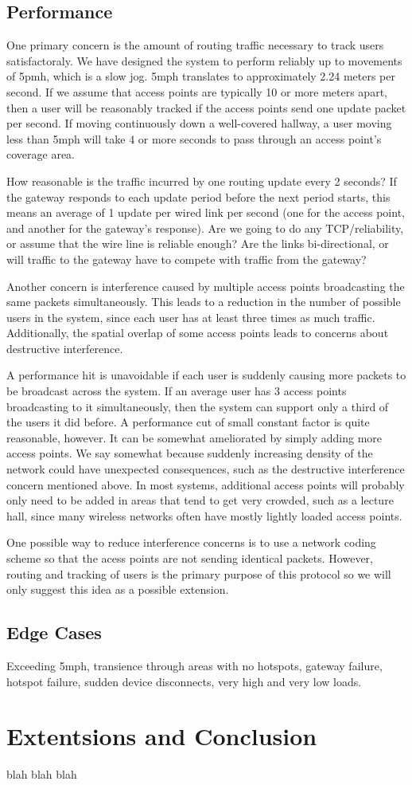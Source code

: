 \documentclass[letterpaper,12pt]{article}
\begin{document}
\subsection{Performance}
One primary concern is the amount of routing traffic necessary to track
users satisfactoraly. We have designed the system to perform reliably
up to movements of 5pmh, which is a slow jog. 5mph translates to approximately
2.24 meters per second. If we assume that access points are typically 10 or more
meters apart, then a user will be reasonably tracked if the access points
send one update packet per second. If moving continuously down a well-covered
hallway, a user moving less than 5mph will take 4 or more seconds to pass
through an access point's coverage area. 

How reasonable is the traffic incurred by one routing update every 2 seconds? 
If the gateway responds to each update period before the next period starts,
this means an average of 1 update per wired link per second (one for the 
access point, and another for the gateway's response). Are we going to do
any TCP/reliability, or assume that the wire line is reliable enough?
Are the links bi-directional, or will traffic to the gateway have to
compete with traffic from the gateway?

Another concern is interference caused by multiple access points broadcasting 
the same packets simultaneously. This leads to a reduction in the number
of possible users in the system, since each user has at least three times
as much traffic. Additionally, the spatial overlap of some access points leads
to concerns about destructive interference. 

A performance hit is unavoidable if each user is suddenly causing more packets
to be broadcast across the system. If an average  user has 3 access points
broadcasting to it simultaneously, then the system can support only a third of
the users it did before. A performance cut of small constant factor is quite
reasonable, however. It can be somewhat ameliorated by simply adding more access 
points. We say somewhat because suddenly increasing density of the network could
have unexpected consequences, such as the destructive interference concern 
mentioned above. In most systems, additional access points will probably only
need to be added in areas that tend to get very crowded, such as a lecture hall,
since many wireless networks often have mostly lightly loaded access points.

One possible way to reduce interference concerns is to use a network coding 
scheme so that the acess points are not sending identical packets. However,
routing and tracking of users is the primary purpose of this protocol so 
we will only suggest this idea as a possible extension.

\subsection{Edge Cases}
Exceeding 5mph, transience through areas with no hotspots, gateway failure, 
hotspot failure, sudden device disconnects, very high and very low loads.

\section{Extentsions and Conclusion}
blah blah blah

{\footnotesize 
}
\end{document}
